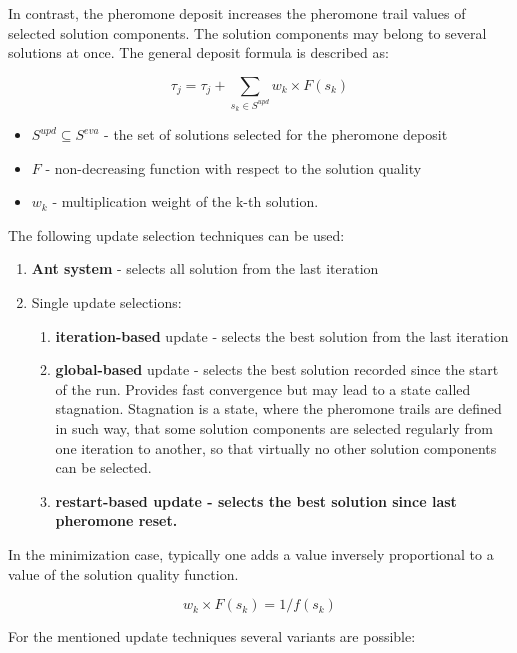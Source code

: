 \documentclass[11pt,a4paper,oneside]{book}
\begin{document}
In contrast, the pheromone deposit increases the pheromone trail values of selected solution components. The solution components may belong to several solutions at once. The general deposit formula is described as:

\begin{equation}
\tau_j = \tau_j + \sum \limits_{s_k \in S^{upd}} w_k \times F(s_k)
\end{equation} 

\begin{itemize}
\item $S^{upd} \subseteq S^{eva}$ - the set of solutions selected for the pheromone deposit
\item $F$ - non-decreasing function with respect to the solution quality
\item $w_k$ - multiplication weight of the k-th solution.  
\end{itemize}

The following update selection techniques can be used:
\begin{enumerate}
\item {\textbf{Ant system} - selects all solution from the last iteration}
\item {Single update selections:}
\begin{enumerate}
\item {\textbf{iteration-based} update - selects the best solution from the last iteration}
\item {\textbf{global-based} update - selects the best solution recorded since the start of the run. Provides fast convergence but may lead to a state called stagnation. Stagnation is a state, where the pheromone trails are defined in such way, that some solution components are selected regularly from one iteration to another, so that virtually no other solution components can be selected.}
\item \textbf{{restart-based} update - selects the best solution since last pheromone reset.}
\end{enumerate}
\end{enumerate}

In the minimization case, typically one adds a value inversely proportional to a value of the solution quality function.

\begin{equation}
w_k \times F(s_k) = 1 / f(s_k)
\end{equation}

For the mentioned update techniques several variants are possible: \\
\end{document}
